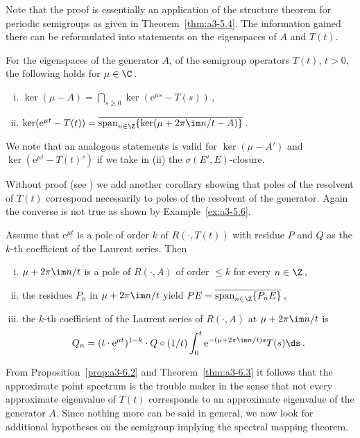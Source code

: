 Note that the proof is essentially an application of the structure theorem for periodic semigroups as given in Theorem~\ref{thm:a3-5.4}.
The information gained there can be reformulated into statements on the eigenspaces of $A$ and $T(t)$.
\begin{corollary}\label{cor:a3-6.4}
For the eigenspaces of the generator $A$, \resp of the semigroup operators $T(t)$, $t > 0$, the following holds  for  $\mu \in \C$\,.
\begin{enumerate}[(i)]
\item 
$\ker(\mu - A) = \bigcap_{s \geq 0} \ker(\mathrm{e}^{\mu s} - T(s))$\,,

\item 
$\ker(\mathrm{e}^{\mu t} - T(t)) = \overline{\mathrm{span}_{n \in \Z} \{\ker(\mu + 2\pi\im  n/t - A)\}}$\,.

\end{enumerate}
\end{corollary}
We note that an analogous statements is valid for $\ker(\mu - A')$ and $\ker(\mathrm{e}^{\mu t} - T(t)')$ if we take in (ii) the $\sigma(E',E)$-closure.

Without proof (see \citet[Proposition~1.10]{greiner:1981}) we add another corollary showing that poles of the resolvent of $T(t)$ correspond necessarily to poles of the resolvent of the generator.
Again the converse is not true as shown by Example~\ref{ex:a3-5.6}.
\begin{corollary}\label{cor:a3-6.5}
Assume that $\mathrm{e}^{\mu t}$ is a pole of order $k$ of $R(\cdot,T(t))$ with residue $P$ and $Q$ as the $k$-th coefficient of the Laurent series.
Then
\begin{enumerate}[(i)]
\item 
$\mu + 2\pi\im  n/t$ is a pole of $R(\cdot,A)$ of order $\leq k$ for every $n \in \Z$\,,

\item 
the residues $P_{n}$ in $\mu + 2\pi\im  n/t$ yield $PE = \overline{\text{span}_{n \in \Z} \{P_{n}E\}}$\,,

\item 
the $k$-th coefficient of the Laurent series of $R(\cdot,A)$ at $\mu + 2\pi\im  n/t$ is
\[
Q_{n} = (t \cdot \mathrm{e}^{\mu t})^{1-k} \cdot Q \circ (1/t) \int_{0}^{t} \mathrm{e}^{-(\mu+2\pi\im  n/t)s}T(s) \ds\,.
\]
\end{enumerate}
\end{corollary}
From Proposition~\ref{prop:a3-6.2} and Theorem~\ref{thm:a3-6.3} it follows that the approximate point spectrum is the trouble maker in the sense that not every approximate eigenvalue of $T(t)$ corresponds to an approximate eigenvalue of the generator $A$.
Since nothing more can be said in general, we now look for additional hypotheses on the semigroup implying the spectral mapping theorem.

